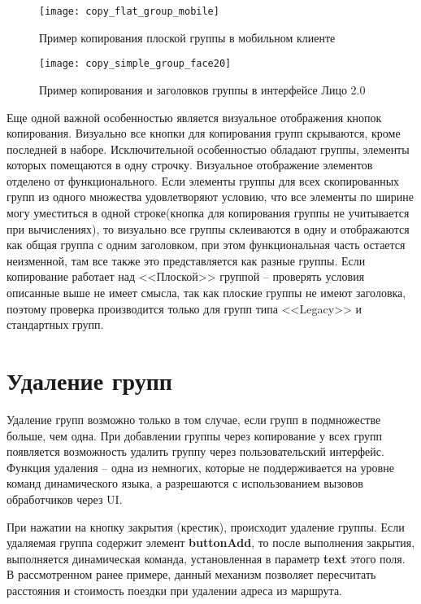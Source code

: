 \documentclass[../index.tex]{subfiles}
\begin{document}
\begin{figure}[h]
    \begin{minipage}[h]{0.49\linewidth}
        \texttt{[image: copy\_flat\_group\_mobile]}
        \centering
        \caption{Пример копирования плоской группы в мобильном клиенте}
    \end{minipage}
    \hfill
    \begin{minipage}[h]{0.49\linewidth}
        \texttt{[image: copy\_simple\_group\_face20]}
        \centering
        \caption{Пример копирования и заголовков группы в интерфейсе Лицо 2.0}
    \end{minipage}
\end{figure}

Еще одной важной особенностью является визуальное отображения кнопок копирования. Визуально все кнопки для копирования групп скрываются, кроме последней в наборе.
Исключительной особенностью обладают группы, элементы которых помещаются в одну строчку. Визуальное отображение элементов отделено от функционального. Если элементы группы для всех скопированных групп из одного множества удовлетворяют условию, что все элементы по ширине могу уместиться в одной строке(кнопка для копирования группы не учитывается при вычислениях), то визуально все группы склеиваются в одну и отображаются как общая группа с одним заголовком, при этом функциональная часть остается неизменной, там все также это представляется как разные группы.
Если копирование работает над <<Плоской>> группой -- проверять условия описанные выше не имеет смысла, так как плоские группы не имеют заголовка, поэтому проверка производится только для групп типа <<Legacy>> и стандартных групп.

\section{Удаление групп}

Удаление групп возможно только в том случае, если групп в подмножестве больше, чем одна. При добавлении группы через копирование у всех групп появляется возможность удалить группу через пользовательский интерфейс. Функция удаления -- одна из немногих, которые не поддерживается на уровне команд динамического языка, а разрешаются с использованием вызовов обработчиков через UI.

При нажатии на кнопку закрытия (крестик), происходит удаление группы. Если удаляемая группа содержит элемент \textbf{buttonAdd}, то после выполнения закрытия, выполняется динамическая команда, установленная в параметр \textbf{text} этого поля. В рассмотренном ранее примере, данный механизм позволяет пересчитать расстояния и стоимость поездки при удалении адреса из маршрута.
\end{document}
